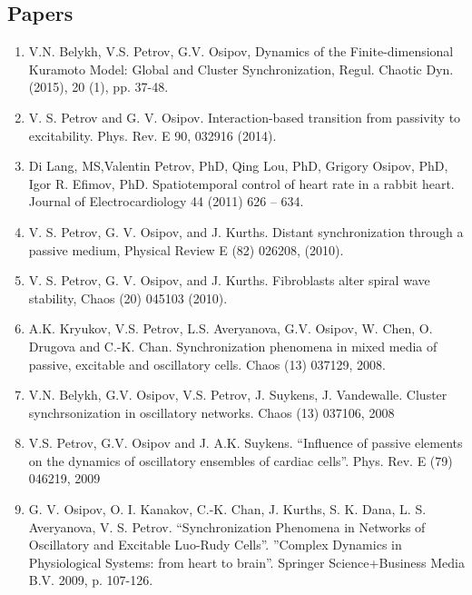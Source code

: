 \documentclass[line,margin,12pt]{res}
\begin{document}
\begin{resume}
\subsection{Papers}
\begin{enumerate}
\item V.N. Belykh, V.S. Petrov, G.V. Osipov, Dynamics of the Finite-dimensional Kuramoto Model: Global and Cluster Synchronization, Regul. Chaotic Dyn. (2015), 20 (1), pp. 37-48.
\item V. S. Petrov and G. V. Osipov. Interaction-based transition from passivity to excitability. Phys. Rev. E 90, 032916 (2014).
\item Di Lang, MS,Valentin Petrov, PhD, Qing Lou, PhD, Grigory Osipov,
PhD, Igor R. Efimov, PhD. Spatiotemporal control of heart rate in a
rabbit heart. Journal of Electrocardiology 44 (2011) 626 – 634.
\item V. S. Petrov, G. V. Osipov, and J. Kurths. Distant
synchronization through a passive medium, Physical Review E
(82) 026208, (2010).
\item V. S. Petrov, G. V. Osipov, and J. Kurths. Fibroblasts alter spiral
wave stability, Chaos (20) 045103 (2010).
\item A.K. Kryukov, V.S. Petrov, L.S. Averyanova, G.V. Osipov,
W.
Chen, O. Drugova and C.-K. Chan. Synchronization phenomena in
mixed media of passive, excitable and oscillatory cells. Chaos (13)
037129, 2008.
\item V.N. Belykh, G.V. Osipov, V.S. Petrov, J. Suykens, J.
Vandewalle. Cluster synchrsonization in oscillatory networks.
Chaos (13) 037106, 2008
\item V.S. Petrov, G.V. Osipov and J. A.K. Suykens. “Influence of
passive elements on the dynamics of oscillatory ensembles of
cardiac cells”. Phys. Rev. E (79) 046219, 2009
\item G. V. Osipov, O. I. Kanakov, C.-K. Chan, J. Kurths, S. K. Dana, L. S.
Averyanova, V. S. Petrov. “Synchronization Phenomena in
Networks of Oscillatory and Excitable Luo-Rudy Cells”. ''Complex
Dynamics in Physiological Systems: from heart to brain''.
Springer Science+Business Media B.V. 2009, p. 107-126.
\end{enumerate}

\end{resume}
\end{document}
